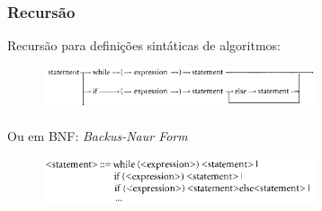 \documentclass[10pt]{beamer}
\begin{document}
\begin{frame}
  \frametitle{Recursão}
  Recursão para definições sintáticas de algoritmos:
  \vfill
  \begin{figure}[h]
    \begin{center}
      \includegraphics[width=8cm]{fig/img03}
    \end{center}
  \end{figure}
  \vfill
  Ou em BNF: \emph{Backus-Naur Form}
  \vfill
  \begin{figure}[h]
    \begin{center}
      \includegraphics[width=8cm]{fig/img04}
    \end{center}
  \end{figure}

\end{frame}
\end{document}
